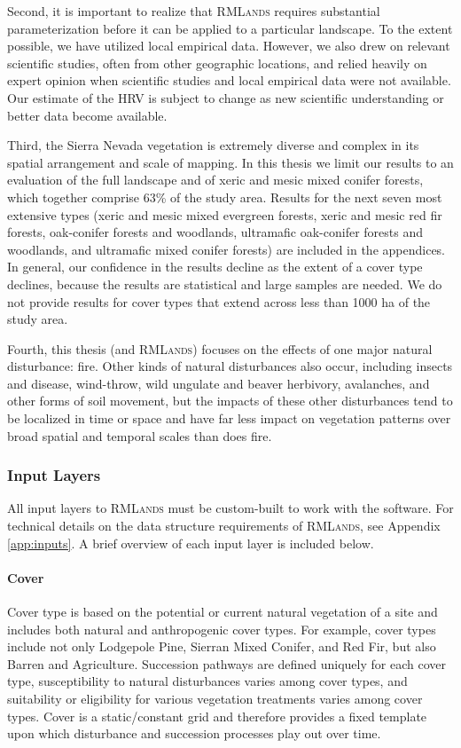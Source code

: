 Second, it is important to realize that \textsc{RMLands} requires substantial parameterization before it can be applied to a particular landscape. To the extent possible, we have utilized local empirical data. However, we also drew on relevant scientific studies, often from other geographic locations, and relied heavily on expert opinion when scientific studies and local empirical data were not available. Our estimate of the HRV is subject to change as new scientific understanding or better data become available.

Third, the Sierra Nevada vegetation is extremely diverse and complex in its spatial arrangement and scale of mapping. In this thesis we limit our results to an evaluation of the full landscape and of xeric and mesic mixed conifer forests, which together comprise 63\% of the study area. Results for the next seven most extensive types (xeric and mesic mixed evergreen forests, xeric and mesic red fir forests, oak-conifer forests and woodlands, ultramafic oak-conifer forests and woodlands, and ultramafic mixed conifer forests) are included in the appendices. In general, our confidence in the results decline as the extent of a cover type declines, because the results are statistical and large samples are needed. We do not provide results for cover types that extend across less than 1000 ha of the study area.

Fourth, this thesis (and \textsc{RMLands}) focuses on the effects of one major natural disturbance: fire. Other kinds of natural disturbances also occur, including insects and disease, wind-throw, wild ungulate and beaver herbivory, avalanches, and other forms of soil movement, but the impacts of these other disturbances tend to be localized in time or space and have far less impact on vegetation patterns over broad spatial and temporal scales than does fire.


\subsubsection{Input Layers}
\label{subsec:hrvinputlayers}

All input layers to \textsc{RMLands} must be custom-built to work with the software. For technical details on the data structure requirements of \textsc{RMLands}, see Appendix \ref{app:inputs}. A brief overview of each input layer is included below.

\paragraph{Cover} Cover type is based on the potential or current natural vegetation of a site and includes both natural and anthropogenic cover types. For example, cover types include not only Lodgepole Pine, Sierran Mixed Conifer, and Red Fir, but also Barren and Agriculture. Succession pathways are defined uniquely for each cover type, susceptibility to natural disturbances varies among cover types, and suitability or eligibility for various vegetation treatments varies among cover types. Cover is a static/constant grid and therefore provides a fixed template upon which disturbance and succession processes play out over time. 

